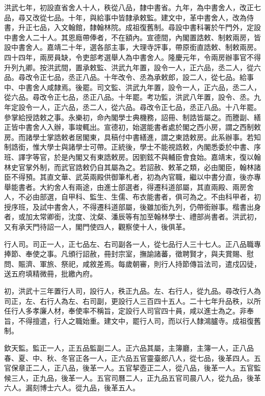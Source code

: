 洪武七年，初設直省舍人十人，秩從八品，隸中書省。九年，為中書舍人，改正七品，尋又改從七品。十年，與給事中皆隸承敕監。建文中，革中書舍人，改為侍書，升正七品，入文翰館，隸翰林院。成祖復舊制。尋設中書科署於午門外，定設中書舍人二十人。其恩廕帶俸者，不在額內。宣德間，內閣置誥敕、制敕兩房，皆設中書舍人。嘉靖二十年，選各部主事，大理寺評事，帶原銜直誥敕、制敕兩房。四十四年，兩房員缺，令吏部考選舉人為中書舍人。隆慶元年，令兩房辦事官不得升列九卿。按洪武間，置承敕監、洪武九年置，設令一人，正六品，丞二人，從六品。尋改令正七品，丞正八品。十年改令、丞為承敕郎，設二人，從七品。給事中、中書舍人咸隸焉。後罷。司文監、洪武九年置，設令一人，正六品，丞二人，從六品。尋改令正七品，丞正八品。十年罷。考功監，洪武八年置，設令、丞。九年定設令一人，正六品，丞二人，從六品。尋改令正七品，丞正八品。十八年罷。參掌給授誥敕之事。永樂初，命內閣學士典機務，詔冊、制誥皆屬之。而謄副、繕正皆中書舍人入辦，事竣輒出。宣德初，始選能書者處於閣之西小房，謂之西制敕房。而諸學士掌誥敕者居閣東，具稿付中書繕進，謂之東誥敕房。此系辦事。若知制誥銜，惟大學士與諸學士可帶。正統後，學士不能視誥敕，內閣悉委於中書、序班、譯字等官，於是內閣又有東誥敕房。因劉鉉不與輔臣會食始。嘉靖末，復以翰林史官掌外制，而武官誥敕仍自其屬為之。若詔赦、敕革之類，必由閣臣，翰林諸臣不得預。其直文華、武英兩殿供御筆札者，初為內官職，繼以中書分直，後亦專舉能書者。大約舍人有兩途，由進士部選者，得遷科道部屬，其直兩殿、兩房舍人，不必由部選，自甲科、監生、生儒、布衣能書者，俱可為之。不由科甲者，初授序班，及試中書舍人，不得遷科道部屬，後雖加銜九列，仍帶銜辦事。楷書出身者，或加太常卿銜，沈度、沈粲、潘辰等有加至翰林學士、禮部尚書者。洪武初，又有承天門待詔一人，閣門使四人，觀察使十人，後俱革。

行人司。司正一人，正七品左、右司副各一人，從七品行人三十七人。正八品職專捧節、奉使之事。凡頒行詔赦，冊封宗室，撫諭諸蕃，徵聘賢才，與夫賞賜、慰問、賑濟、軍旅、祭祀，咸敘差焉。每歲朝審，則行人持節傳旨法司，遣戍囚徒，送五府填精微冊，批繳內府。

初，洪武十三年置行人司，設行人，秩正九品。左、右行人，從九品。尋改行人為司正，左、右行人為左、右司副，更設行人三百四十五人。二十七年升品秩，以所任行人多孝廉人材，奉使率不稱旨，定設行人司官四十員，咸以進士為之。非奉旨，不得擅遣，行人之職始重。建文中，罷行人司，而以行人隸鴻臚寺。成祖復舊制。

欽天監。監正一人，正五品監副二人。正六品其屬，主簿廳，主簿一人，正八品春、夏、中、秋、冬官正各一人，正六品五官靈臺郎八人，從七品，後革四人。五官保章正二人，正八品，後革一人。五官挈壺正二人，從八品，後革一人。五官監候三人，正九品，後革一人。五官司曆二人，正九品五官司晨八人，從九品，後革六人。漏刻博士六人。從九品，後革五人。

